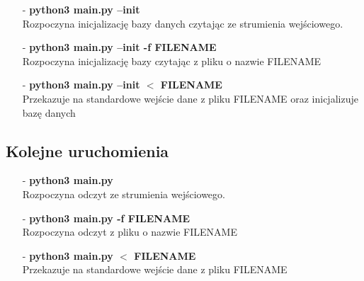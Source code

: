 \documentclass[a4paper]{article}
\begin{document}
\begin{itemize}
    \itemsep0em
    \item[-] \textbf{python3 main.py --init} \\ 
        Rozpoczyna inicjalizację bazy danych czytając ze strumienia wejściowego.
    \item[-] \textbf{python3 main.py --init -f FILENAME} \\  
        Rozpoczyna inicjalizację bazy czytając z pliku o nazwie FILENAME
    \item[-] \textbf{python3 main.py --init $<$ FILENAME} \\  
        Przekazuje na standardowe wejście dane z pliku FILENAME oraz inicjalizuje bazę danych
     
\end{itemize}

\subsection{Kolejne uruchomienia}
\begin{itemize}
    \itemsep0em
    \item[-] \textbf{python3 main.py} \\ 
        Rozpoczyna odczyt ze strumienia wejściowego.
    \item[-] \textbf{python3 main.py -f FILENAME} \\  
        Rozpoczyna odczyt z pliku o nazwie FILENAME
    \item [-] \textbf{python3 main.py $<$ FILENAME} \\
        Przekazuje na standardowe wejście dane z pliku FILENAME

\end{itemize}
\end{document}
